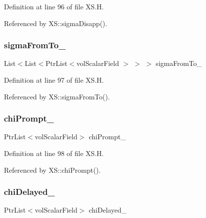 Definition at line 96 of file X\+S.\+H.



Referenced by X\+S\+::sigma\+Disapp().

\mbox{\label{classFoam_1_1XS_a3446c6c1eba7715a184c7198bcf6d874}} 
\subsubsection{\texorpdfstring{sigma\+From\+To\+\_\+}{sigmaFromTo\_}}
{\footnotesize\ttfamily List$<$List$<$Ptr\+List$<$vol\+Scalar\+Field $>$ $>$ $>$ sigma\+From\+To\+\_\+\hspace{0.3cm}{\ttfamily [protected]}}



Definition at line 97 of file X\+S.\+H.



Referenced by X\+S\+::sigma\+From\+To().

\mbox{\label{classFoam_1_1XS_aed62b74823cc5c088012d6ae59d23c1d}} 
\subsubsection{\texorpdfstring{chi\+Prompt\+\_\+}{chiPrompt\_}}
{\footnotesize\ttfamily Ptr\+List$<$vol\+Scalar\+Field$>$ chi\+Prompt\+\_\+\hspace{0.3cm}{\ttfamily [protected]}}



Definition at line 98 of file X\+S.\+H.



Referenced by X\+S\+::chi\+Prompt().

\mbox{\label{classFoam_1_1XS_ab5552da3b10e90d186bf98aead06bcd4}} 
\subsubsection{\texorpdfstring{chi\+Delayed\+\_\+}{chiDelayed\_}}
{\footnotesize\ttfamily Ptr\+List$<$vol\+Scalar\+Field$>$ chi\+Delayed\+\_\+\hspace{0.3cm}{\ttfamily [protected]}}



